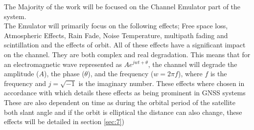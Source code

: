 \documentclass[conference]{IEEEtran}
\begin{document}
The Majority of the work will be focused on the Channel Emulator part of the system.\\

The Emulator will primarily focus on the following effects; Free space loss, Atmospheric Effects, Rain Fade, Noise Temperature, multipath fading and scintillation and the effects of orbit. All of these effects have a significant impact on the channel. They are both complex and real degradation. This means that for an electromagnetic wave represented as $Ae^{j w t+\theta}$, the channel will degrade the amplitude ($A$), the phase ($\theta$), and the frequency ($w = 2\pi f$), where $f$ is the frequency and $j= \sqrt{-1}$ is the imaginary number. These effects where chosen in accordance with \cite{kaplan_understanding_2017} which details these effects as being prominent in GNSS systems\\

These are also dependent on time as during the orbital period of the satellite both slant angle \cite{seybold_introduction_2005} and if the orbit is elliptical \cite{10.5555/2601574} the distance can also change, these effects will be detailed in section \ref{sec:7})
\label{sec:intro}
\end{document}
